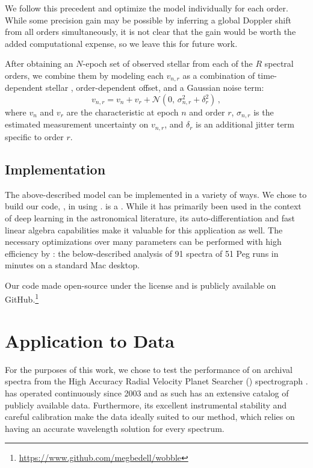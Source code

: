 \documentclass[modern]{aastex62}
\begin{document}
We follow this precedent and optimize the \wobble model individually for each order.
While some \RV precision gain may be possible by inferring a global Doppler shift from all orders simultaneously, it is not clear that the gain would be worth the added computational expense, so we leave this for future work.

After obtaining an $N$-epoch set of observed stellar \RVs from each of the $R$ spectral orders, we combine them by modeling each \RV $v_{n,r}$ as a combination of time-dependent stellar \RV, order-dependent \RV offset, and a Gaussian noise term:
\begin{equation}
v_{n,r} = v_n + v_r + \mathcal{N}(0,\,\sigma_{n,r}^{2} + \delta_r^2 )\,,
\end{equation}
where $v_n$ and $v_r$ are the characteristic \RVs at epoch $n$ and order $r$, $\sigma_{n,r}$ is the estimated measurement uncertainty on $v_{n,r}$, and $\delta_r$ is an additional jitter term specific to order $r$.


\subsection{Implementation}
\label{s:implementation}

The above-described model can be implemented in a variety of ways. We chose to build our code, \wobble, in  using \TF.
\TF is a .
While it has primarily been used in the context of deep learning in the astronomical literature, its auto-differentiation and fast linear algebra capabilities make it valuable for this application as well.
The necessary optimizations over many parameters can be performed with high efficiency by \TF: the below-described analysis of 91 spectra of 51 Peg runs in  minutes on a standard Mac desktop.

Our code made open-source under the  license and is publicly available on GitHub.\footnote{\url{https://www.github.com/megbedell/wobble}}



\section{Application to \HARPS Data}
\label{s:results}

For the purposes of this work, we chose to test the performance of \wobble on archival spectra from the High Accuracy Radial Velocity Planet Searcher (\HARPS) spectrograph \citep{Mayor2003}.
\HARPS has operated continuously since 2003 and as such has an extensive catalog of publicly available data.
Furthermore, its excellent instrumental stability and careful calibration make the data ideally suited to our method, which relies on having an accurate wavelength solution for every spectrum.
\end{document}
